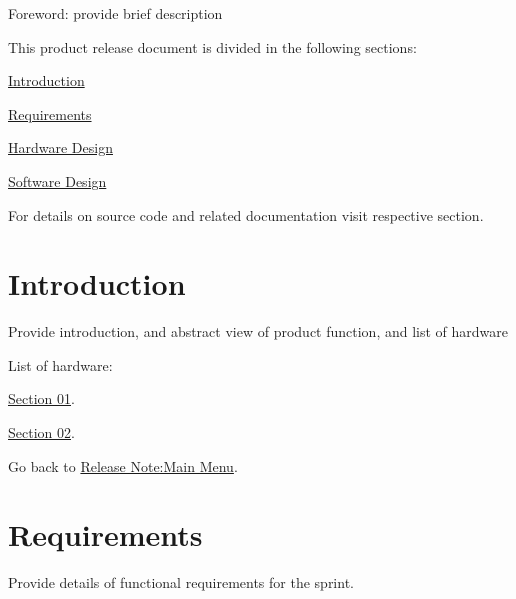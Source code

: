 Foreword\+: provide brief description

This product release document is divided in the following sections\+:
\begin{DoxyItemize}
\item \hyperlink{introduction}{Introduction}
\item \hyperlink{requirements}{Requirements}
\item \hyperlink{hardware_design}{Hardware Design}
\item \hyperlink{software_design}{Software Design}
\end{DoxyItemize}

For details on source code and related documentation visit respective section. \hypertarget{introduction}{}\section{Introduction}\label{introduction}
Provide introduction, and abstract view of product function, and list of hardware

List of hardware\+:
\begin{DoxyItemize}
\item \hyperlink{hardware_design_hw_section_01}{Section 01}.
\item \hyperlink{hardware_design_hw_section_02}{Section 02}.
\end{DoxyItemize}

Go back to \hyperlink{product_release_main_page}{Release Note\+:Main Menu}. \hypertarget{requirements}{}\section{Requirements}\label{requirements}
Provide details of functional requirements for the sprint.

